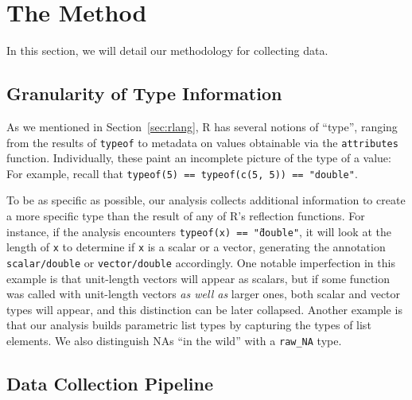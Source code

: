 \documentclass[acmsmall,10pt,review,anonymous]{acmart}\settopmatter{printfolios=true,printccs=false,printacmref=false}
\newcommand{\code}[1]{\lstinline|#1|\xspace}
\begin{document}


\section{The Method}

In this section, we will detail our methodology for collecting data.

%
%
%
%
\subsection{Granularity of Type Information}

As we mentioned in Section~\ref{sec:rlang}, R has several notions of ``type'', ranging from the results of \code{typeof} to metadata on values obtainable via the \code{attributes} function.
Individually, these paint an incomplete picture of the type of a value:
For example, recall that \code{typeof(5) == typeof(c(5, 5)) == "double"}.

To be as specific as possible, our analysis collects additional information to create a more specific type than the result of any of R's reflection functions.
For instance, if the analysis encounters {\tt typeof(x) == \~ "double"}, it will look at the length of {\tt x} to determine if {\tt x} is a scalar or a vector, generating the annotation {\tt scalar/double} or {\tt vector/double} accordingly. 
One notable imperfection in this example is that unit-length vectors will appear as scalars, but if some function was called with unit-length vectors {\it as well as} larger ones, both scalar and vector types will appear, and this distinction can be later collapsed.
Another example is that our analysis builds parametric list types by capturing the types of list elements.
We also distinguish NAs ``in the wild'' with a {\tt raw\_NA} type.

%
%
%
%
\subsection{Data Collection Pipeline}
\end{document}
